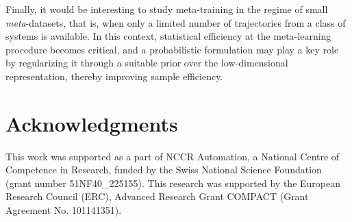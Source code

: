 \documentclass{article}
\begin{document}
Finally, it would be interesting to study meta-training in the regime of small \emph{meta}-datasets, that is, when only a limited number of trajectories from a class of systems is available. In this context, statistical efficiency at the meta-learning procedure becomes critical, and a probabilistic formulation may play a key role by regularizing it through a suitable prior over the low-dimensional representation, thereby improving sample efficiency.

\section*{Acknowledgments}
This work was supported as a part of NCCR Automation, a National Centre of Competence in Research, funded by the Swiss National Science Foundation (grant number 51NF40\_225155). This research was supported by the European Research Council (ERC), Advanced Research Grant COMPACT (Grant Agreement No. 101141351).



\end{document}
